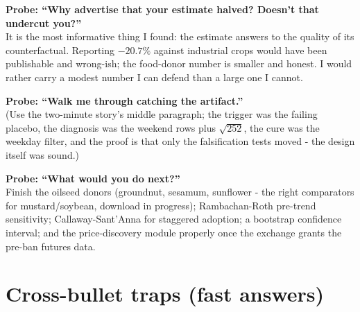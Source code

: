 \documentclass[11pt]{article}
\newcommand{\Q}[1]{\smallskip\noindent\textbf{Probe: #1}\\}
\begin{document}
\Q{``Why advertise that your estimate halved? Doesn't that undercut you?''}
It is the most informative thing I found: the estimate answers to the quality of its
counterfactual. Reporting $-20.7\%$ against industrial crops would have been publishable
and wrong-ish; the food-donor number is smaller and honest. I would rather carry a modest
number I can defend than a large one I cannot.

\Q{``Walk me through catching the artifact.''}
(Use the two-minute story's middle paragraph; the trigger was the failing placebo, the
diagnosis was the weekend rows plus $\sqrt{252}$, the cure was the weekday filter, and the
proof is that only the falsification tests moved - the design itself was sound.)

\Q{``What would you do next?''}
Finish the oilseed donors (groundnut, sesamum, sunflower - the right comparators for
mustard/soybean, download in progress); Rambachan-Roth pre-trend sensitivity;
Callaway-Sant'Anna for staggered adoption; a bootstrap confidence interval; and the
price-discovery module properly once the exchange grants the pre-ban futures data.

\section{Cross-bullet traps (fast answers)}
\end{document}
